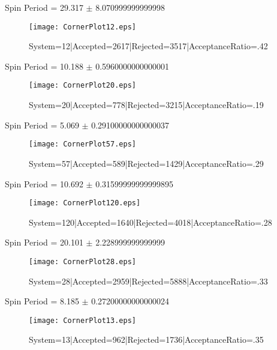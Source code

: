 \documentclass[10pt]{article}
\begin{document}
\begin{center}
        Spin Period = 29.317 $\pm$ 8.070999999999998
        \end{center}
\begin{figure}[h] 
        \texttt{[image: CornerPlot12.eps]}
        \caption{System=12|Accepted=2617|Rejected=3517|AcceptanceRatio=.42}
        \label{S12}
        \centering
        \end{figure}
\begin{center}
        Spin Period = 10.188 $\pm$ 0.5960000000000001
        \end{center}
\begin{figure}[h] 
        \texttt{[image: CornerPlot20.eps]}
        \caption{System=20|Accepted=778|Rejected=3215|AcceptanceRatio=.19}
        \label{S20}
        \centering
        \end{figure}
\begin{center}
        Spin Period = 5.069 $\pm$ 0.29100000000000037
        \end{center}
\begin{figure}[h] 
        \texttt{[image: CornerPlot57.eps]}
        \caption{System=57|Accepted=589|Rejected=1429|AcceptanceRatio=.29}
        \label{S57}
        \centering
        \end{figure}
\begin{center}
        Spin Period = 10.692 $\pm$ 0.31599999999999895
        \end{center}
\begin{figure}[h] 
        \texttt{[image: CornerPlot120.eps]}
        \caption{System=120|Accepted=1640|Rejected=4018|AcceptanceRatio=.28}
        \label{S120}
        \centering
        \end{figure}
\begin{center}
        Spin Period = 20.101 $\pm$ 2.228999999999999
        \end{center}
\begin{figure}[h] 
        \texttt{[image: CornerPlot28.eps]}
        \caption{System=28|Accepted=2959|Rejected=5888|AcceptanceRatio=.33}
        \label{S28}
        \centering
        \end{figure}
\begin{center}
        Spin Period = 8.185 $\pm$ 0.27200000000000024
        \end{center}
\begin{figure}[h] 
        \texttt{[image: CornerPlot13.eps]}
        \caption{System=13|Accepted=962|Rejected=1736|AcceptanceRatio=.35}
        \label{S13}
        \centering
        \end{figure}
\end{document}
